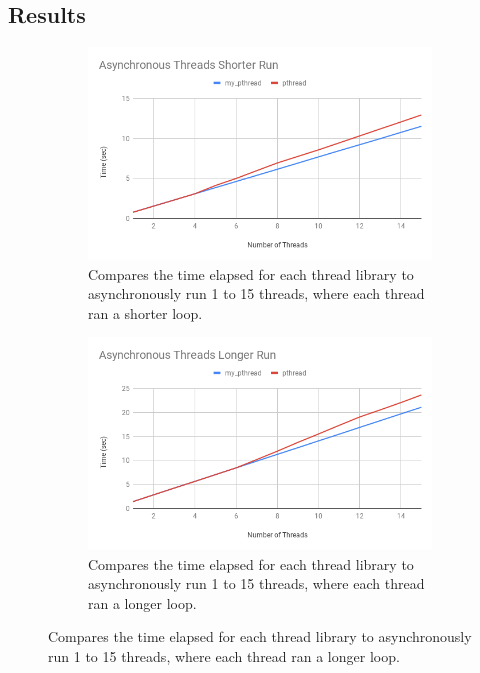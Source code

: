 \documentclass{article}
\begin{document}
\subsection{Results}
\begin{figure}[!h]
    \centering
    \begin{subfigure}[b]{.49\textwidth}
        \includegraphics[width=\textwidth]{Asynchronous_Threads_Shorter_Run.png}
        \caption{Compares the time elapsed for each thread library to asynchronously run 1 to 15 threads, where each thread ran a shorter loop.}
        \label{async_short}
    \end{subfigure}
    \begin{subfigure}[b]{.49\textwidth}
        \includegraphics[width=\textwidth]{Asynchronous_Threads_Longer_Run.png}
        \caption{Compares the time elapsed for each thread library to asynchronously run 1 to 15 threads, where each thread ran a longer loop.}
        \label{async_long}
    \end{subfigure}

\end{figure}
\end{document}

